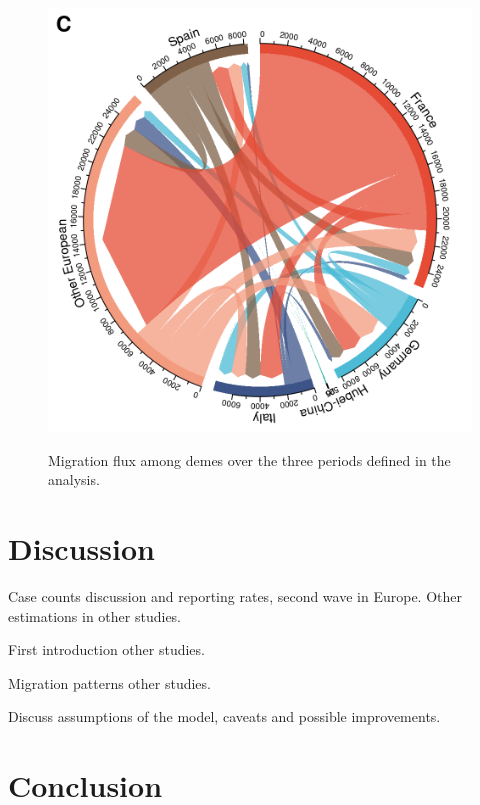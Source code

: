 \documentclass[12pt,]{article}
\begin{document}
\begin{figure}[!tbp]
\begin{minipage}[t]{0.4\textwidth}
  \label{fig:migs2}
  \end{minipage}
  \begin{minipage}[t]{0.4\textwidth}
  \includegraphics[width=\textwidth]{201030_europe3_figtraj09c.png}
  \label{fig:migs3}
  \end{minipage}
  \caption{Migration flux among demes over the three periods defined in the analysis.}
  \label{fig:migs}
\end{figure}


\section*{Discussion}

\item Case counts discussion and reporting rates, second wave in Europe. Other estimations in other studies.

\item First introduction other studies. 

\item Migration patterns other studies.

\item Discuss assumptions of the model, caveats and possible improvements.


\section*{Conclusion}
\end{document}
